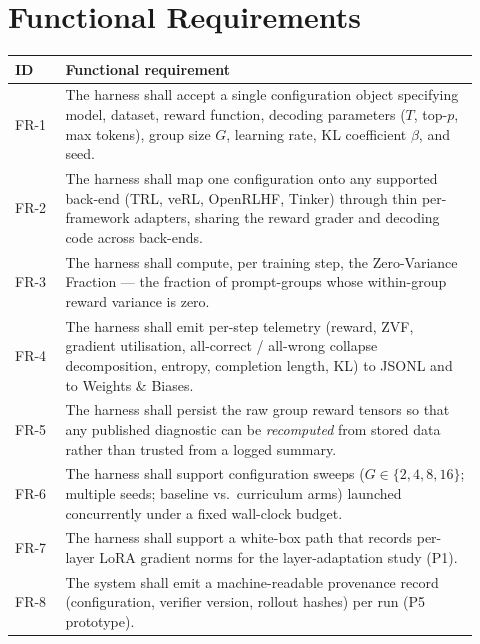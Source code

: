 \documentclass[12pt,a4paper]{report}
\begin{document}
\section{Functional Requirements}
\begin{longtable}{@{}L{0.10\linewidth}L{0.82\linewidth}@{}}
\toprule
\textbf{ID} & \textbf{Functional requirement} \\
\midrule
\endhead
FR-1 & The harness shall accept a single configuration object specifying model,
dataset, reward function, decoding parameters ($T$, top-$p$, max tokens), group
size $G$, learning rate, KL coefficient $\beta$, and seed. \\
FR-2 & The harness shall map one configuration onto any supported back-end (TRL,
veRL, OpenRLHF, Tinker) through thin per-framework adapters, sharing the reward
grader and decoding code across back-ends. \\
FR-3 & The harness shall compute, per training step, the Zero-Variance Fraction ---
the fraction of prompt-groups whose within-group reward variance is zero. \\
FR-4 & The harness shall emit per-step telemetry (reward, ZVF, gradient
utilisation, all-correct / all-wrong collapse decomposition, entropy, completion
length, KL) to JSONL and to Weights \& Biases. \\
FR-5 & The harness shall persist the raw group reward tensors so that any published
diagnostic can be \emph{recomputed} from stored data rather than trusted from a
logged summary. \\
FR-6 & The harness shall support configuration sweeps ($G\in\{2,4,8,16\}$; multiple
seeds; baseline vs.\ curriculum arms) launched concurrently under a fixed
wall-clock budget. \\
FR-7 & The harness shall support a white-box path that records per-layer LoRA
gradient norms for the layer-adaptation study (P1). \\
FR-8 & The system shall emit a machine-readable provenance record (configuration,
verifier version, rollout hashes) per run (P5 prototype). \\
\bottomrule
\end{longtable}
\end{document}
